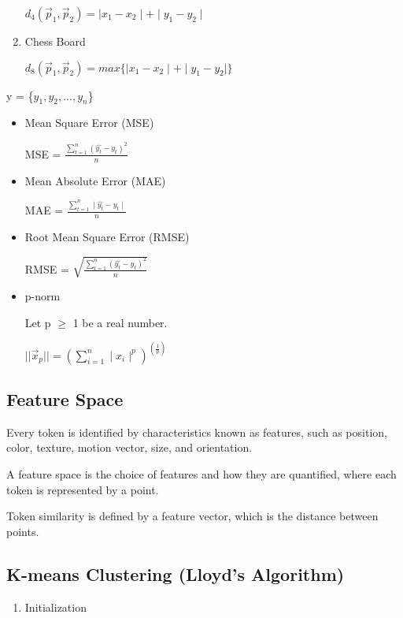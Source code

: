 \documentclass{article}
\begin{document}
\begin{multicols}{2}
\begin{enumerate}
  $d_4(\vec p_1, \vec p_2) = \mid x_1 - x_2 \mid + \mid y_1 - y_2 \mid$

  \item {Chess Board}
  
  $d_8(\vec p_1, \vec p_2) = max\{\mid x_1 - x_2 \mid + \mid y_1 - y_2 \mid\}$

\end{enumerate}

y = \{$y_1, y_2, ..., y_n$\}

\begin{itemize}
  \item {Mean Square Error (MSE)}
  
  MSE = $\frac{\sum_{t=1}^n (\hat{y_t} - y_t)^2}{n}$

  \item {Mean Absolute Error (MAE)}
  
  MAE = $\frac{\sum_{t=1}^n \mid \hat{y_t} - y_t \mid}{n}$

  \item {Root Mean Square Error (RMSE)}
  
  RMSE = $\sqrt{\frac{\sum_{t=1}^n (\hat{y_t} - y_t)^2}{n}}$

  \item {p-norm}
  
  Let p $\geq$ 1 be a real number.

  $||\vec x_p|| = (\sum_{i=1}^n \mid x_i \mid ^p)^(\frac{1}{p})$

\end{itemize}

\subsection{Feature Space}

Every token is identified by characteristics known as features, such as position, color, texture, motion vector, size, and orientation.

A feature space is the choice of features and how they are quantified, where each token is represented by a point.

Token similarity is defined by a feature vector, which is the distance between points.

\subsection{K-means Clustering (Lloyd's Algorithm)}

\begin{enumerate}
  \item {Initialization}
  

\end{enumerate}
\end{multicols}
\end{document}
